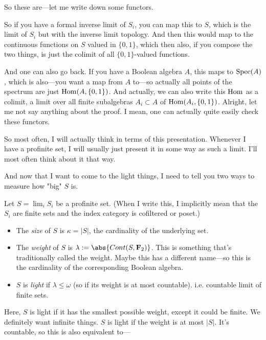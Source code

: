 So these are---let me write down some functors.


So if you have a formal inverse limit of $S_i$, you can map this to $S$, which is the limit of $S_i$ but with the inverse limit topology. 
And then this would map to the continuous functions on $S$ valued in $\{0,1\}$, which then also, if you compose the two things, is just the colimit of all $\{0,1\}$-valued functions.

And one can also go back. If you have a Boolean algebra $A$, this maps to $\operatorname{Spec}(A)$, which is also---you want a map from $A$ to---so actually all points of the spectrum are just $\operatorname{Hom}(A, \{0,1\})$. And actually, we can also write this $\operatorname{Hom}$ as a colimit, a limit over all finite subalgebras $A_i \subset A$ of $\operatorname{Hom}(A_i, \{0,1\})$. Alright, let me not say anything about the proof. I mean, one can actually quite easily check these functors.

So most often, I will actually think in terms of this presentation. Whenever I have a profinite set, I will usually just present it in some way as such a limit. I'll most often think about it that way.

And now that I want to come to the light things, I need to tell you two ways to measure how "big" $S$ is. 

\begin{definition}
Let $S = \lim_{i} S_i$ be a profinite set. (When I write this, I implicitly mean that the $S_i$ are finite sets and the index category is cofiltered or poset.)

\begin{itemize}
\item The \emph{size} of $S$ is $\kappa = |S|$, the cardinality of the underlying set. 
\item The \emph{weight} of $S$ is  $\lambda := \abs{Cont(S, \F_2)}$. This is something that's traditionally called the weight. Maybe this has a different name---so this is the cardinality of the corresponding Boolean algebra.
\item $S$ is \emph{light} if $\lambda \leq \omega$ (so if its weight is at most countable). i.e. countable limit of finite sets.
\end{itemize}

Here, $S$ is light if it has the smallest possible weight, except it could be finite. We definitely want infinite things. $S$ is light if the weight is at most $|S|$. It's countable, so this is also equivalent to--- 

\end{definition}

